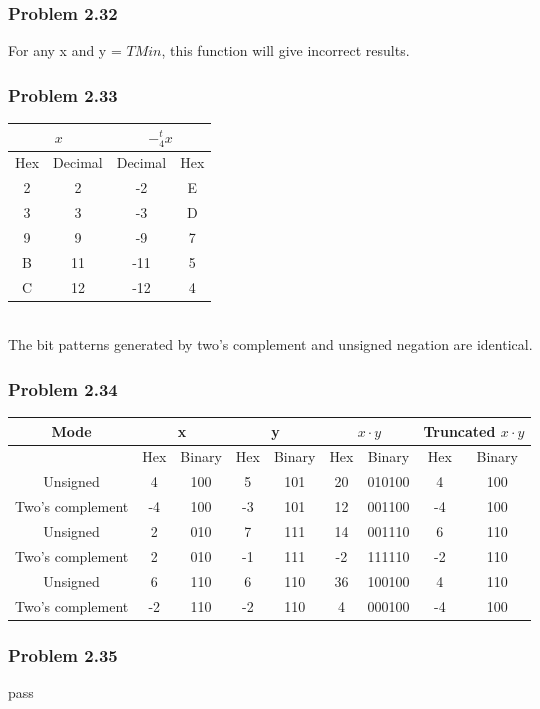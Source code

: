 \documentclass[a4paper]{article}
\begin{document}
\subsubsection*{Problem 2.32}
For any x and y = $TMin$, this function will give incorrect results.

\subsubsection*{Problem 2.33}
\begin{tabular}{c|c|c|c}
    \multicolumn{2}{c|}{$x$}&\multicolumn{2}{c}{$-^t_4x$}\\
    \hline
    Hex&Decimal&Decimal&Hex\\
    \hline
    2&2&-2&E\\
    3&3&-3&D\\
    9&9&-9&7\\
    B&11&-11&5\\
    C&12&-12&4\\

\end{tabular}\\
The bit patterns generated by two's complement and unsigned negation are identical.

\subsubsection*{Problem 2.34}
\begin{tabular}{c|cc|cc|cc|cc}
    Mode&\multicolumn{2}{|c|}{x}&\multicolumn{2}{|c|}{y}&\multicolumn{2}{|c|}{$x\cdot y$}&\multicolumn{2}{c}{Truncated $x\cdot y$}\\
    \hline
    {}&Hex&Binary&Hex&Binary&Hex&Binary&Hex&Binary\\
    \hline
    Unsigned&4&100&5&101&20&010100&4&100\\
    Two's complement&-4&100&-3&101&12&001100&-4&100\\
    \hline
    Unsigned&2&010&7&111&14&001110&6&110\\
    Two's complement&2&010&-1&111&-2&111110&-2&110\\
    \hline
    Unsigned&6&110&6&110&36&100100&4&110\\
    Two's complement&-2&110&-2&110&4&000100&-4&100
\end{tabular}

\subsubsection*{Problem 2.35}
pass
\end{document}
